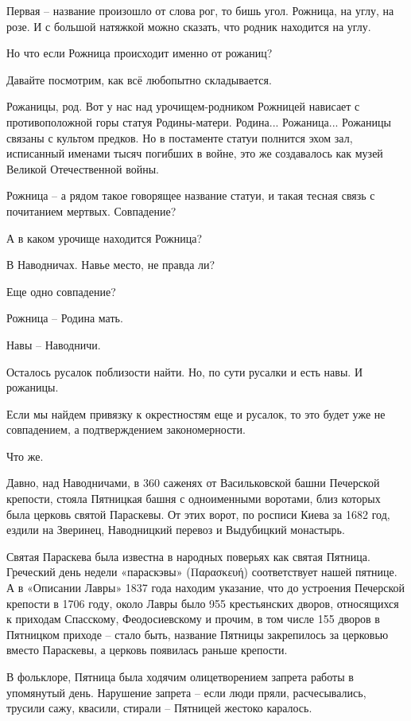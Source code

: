 \documentclass[a5paper,11pt,openany]{article}
\begin{document}
   Первая – название произошло от слова рог, то бишь угол. Рожница, на углу, на розе. И с большой натяжкой можно сказать, что родник находится на углу.

   Но что если Рожница происходит именно от рожаниц?

   Давайте посмотрим, как всё любопытно складывается.

    Рожаницы, род. Вот у нас над урочищем-родником Рожницей нависает с противоположной горы статуя Родины-матери. Родина... Рожаница... Рожаницы связаны с культом предков. Но в постаменте статуи полнится эхом зал, исписанный именами тысяч погибших в войне, это же создавалось как музей Великой Отечественной войны.

   Рожница – а рядом такое говорящее название статуи, и такая тесная связь с почитанием мертвых. Совпадение?

   А в каком урочище находится Рожница? 

   В Наводничах. Навье место, не правда ли?

   Еще одно совпадение? 

   Рожница – Родина мать.

   Навы – Наводничи.

   Осталось русалок поблизости найти. Но, по сути русалки и есть навы. И рожаницы.

   Если мы найдем привязку к окрестностям еще и русалок, то это будет уже не совпадением, а подтверждением закономерности.

   Что же.

   Давно, над Наводничами, в 360 саженях от Васильковской башни Печерской крепости, стояла Пятницкая башня с одноименными воротами, близ которых была церковь святой Параскевы. От этих ворот, по росписи Киева за 1682 год, ездили на Зверинец, Наводницкий перевоз и Выдубицкий монастырь.

   Святая Параскева была известна в народных поверьях как святая Пятница. Греческий день недели «параскэвы» (Παρασκευή) соответствует нашей пятнице. А в «Описании Лавры» 1837 года находим указание, что до устроения Печерской крепости в 1706 году, около Лавры было 955 крестьянских дворов, относящихся к приходам Спасскому, Феодосиевскому и прочим, в том числе 155 дворов в Пятницком приходе – стало быть, название Пятницы закрепилось за церковью вместо Параскевы, а церковь появилась раньше крепости.

   В фольклоре, Пятница была ходячим олицетворением запрета работы в упомянутый день. Нарушение запрета – если люди пряли, расчесывались, трусили сажу, квасили, стирали – Пятницей жестоко каралось.
\end{document}

